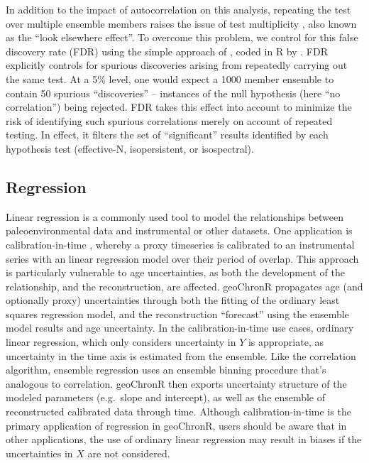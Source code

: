 \documentclass[gchron, manuscript]{copernicus}
\begin{document}
In addition to the impact of autocorrelation on this analysis, repeating the test over multiple ensemble members raises the issue of test multiplicity \citep{Ventura2004}, also known as the ``look elsewhere effect''.
To overcome this problem, we control for this false discovery rate (FDR) using the simple approach of \citet{BenjaminiHochberg95}, coded in R by \citet{Ventura2004}.
FDR explicitly controls for spurious discoveries arising from repeatedly carrying out the same test.
At a 5\% level, one would expect a 1000 member ensemble to contain 50 spurious ``discoveries'' -- instances of the null hypothesis (here ``no correlation'') being rejected.
FDR takes this effect into account to minimize the risk of identifying such spurious correlations merely on account of repeated testing.
In effect, it filters the set of ``significant'' results identified by each hypothesis test (effective-N, isopersistent, or isospectral).

\subsection{Regression}

Linear regression is a commonly used tool to model the relationships between paleoenvironmental data and instrumental or other datasets.
One application is calibration-in-time \citep{grosjean2009calibration}, whereby a proxy timeseries is calibrated to an instrumental series with an linear regression model over their period of overlap.
This approach is particularly vulnerable to age uncertainties, as both the development of the relationship, and the reconstruction, are affected.
geoChronR propagates age (and optionally proxy) uncertainties through both the fitting of the ordinary least squares regression model, and the reconstruction ``forecast'' using the ensemble model results and age uncertainty.
In the calibration-in-time use cases, ordinary linear regression, which only considers uncertainty in \(Y\) is appropriate, as uncertainty in the time axis is estimated from the ensemble.
Like the correlation algorithm, ensemble regression uses an ensemble binning procedure that's analogous to correlation.
geoChronR then exports uncertainty structure of the modeled parameters (e.g.~slope and intercept), as well as the ensemble of reconstructed calibrated data through time.
Although calibration-in-time is the primary application of regression in geoChronR, users should be aware that in other applications, the use of ordinary linear regression may result in biases if the uncertainties in \(X\) are not considered.
\end{document}
